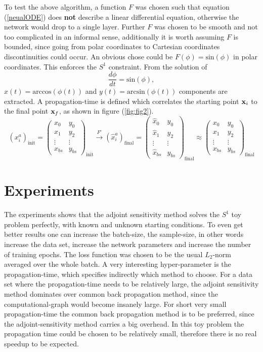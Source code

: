 \documentclass[12pt,a4paper]{article}
\begin{document}
To test the above algorithm, a function $F$ was chosen such that equation (\ref{neualODE}) does \textbf{not} describe a linear differential equation, otherwise the network would drop to a single layer. Further $F$ was chosen to be smooth and not too complicated in an informal sense, additionally it is worth assuming $F$ is bounded, since going from polar coordinates to Cartesian coordinates discontinuities could occur. An obvious chose could be $F(\phi) = \text{sin}(\phi)$ in polar coordinates. This enforces the $S^1$ constraint. From the solution of 
\begin{equation}
	\label{dphi}
	\frac{d \phi}{dt} = \text{sin}(\phi),
\end{equation}$x(t)=\text{arccos}(\phi(t))$ and $y(t)=\text{arcsin}(\phi(t))$ components are extracted. A propagation-time is defined which correlates the starting point $\textbf{x}_i$ to the final point $\textbf{x}_f$, as shown in figure (\ref{fig:fig2}). 
$$
(x^a_i)_\text{init} =  \begin{pmatrix}
x_0 & y_0 \\
x_1 & y_2 \\
\vdots & \vdots \\
x_{bs} & y_{bs} 
\end{pmatrix}_\text{init} \xrightarrow[]{F'} (\hat{x}^a_i)_\text{final} = \begin{pmatrix}
\hat{x}_0 & \hat{y}_0 \\
\hat{x}_1 & \hat{y}_2 \\
\vdots & \vdots \\
\hat{x}_{bs} & \hat{y}_{bs} 
\end{pmatrix}_\text{final} \approx \begin{pmatrix}
x_0 & y_0 \\
x_1 & y_2 \\
\vdots & \vdots \\
x_{bs} & y_{bs} 
\end{pmatrix}_\text{final}
$$
\section{Experiments}
The experiments shows that the adjoint sensitivity method solves the $S^1$ toy problem perfectly, with known and unknown starting conditions. To even get better results one can increase the batch-size, the sample-size, in other words increase the data set, increase the network parameters and increase the number of training epochs. The loss function was chosen to be the usual $L_2$-norm averaged over the whole batch. A very interesting hyper-parameter is the propagation-time, which specifies indirectly which method to choose. For a data set where the propagation-time needs to be relatively large, the adjoint sensitivity method dominates over common back propagation method, since the computational-graph would become insanely large. For short very small propagation-time the common back propagation method is to be preferred, since the adjoint-sensitivity method carries a big overhead. In this toy problem the propagation time could be chosen to be relatively small, therefore there is no real speedup to be expected. 
\end{document}
